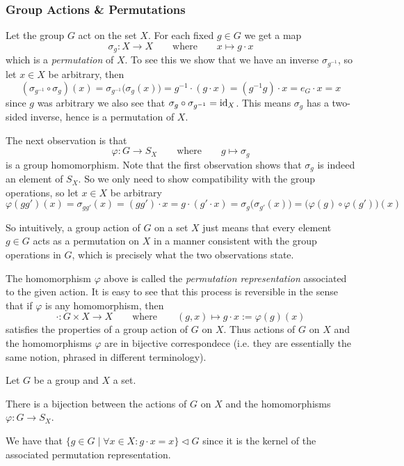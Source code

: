 \subsubsection{Group Actions \& Permutations}
Let the group \(G\) act on the set \(X\).
For each fixed \(g \in G\) we get a map
\[\sigma_g: X \to X \qquad\text{where}\qquad x \mapsto g \cdot x\]
which is a \emph{permutation} of \(X\).
To see this we show that we have an inverse \(\sigma_{g^{-1}}\), so let \(x \in X\) be arbitrary, then
\[(\sigma_{g^{-1}} \circ \sigma_g)(x) = \sigma_{g^{-1}}\big(\sigma_g(x)\big) = g^{-1} \cdot (g \cdot x) = (g^{-1}g) \cdot x = e_G \cdot x = x\]
since \(g\) was arbitrary we also see that \(\sigma_g \circ \sigma_{g^{-1}} = \operatorname{id}_X\).
This means \(\sigma_g\) has a two-sided inverse, hence is a permutation of \(X\).

The next observation is that
\[\varphi: G \to S_X \qquad\text{where}\qquad g \mapsto \sigma_g\]
is a group homomorphism.
Note that the first observation shows that \(\sigma_g\) is indeed an element of \(S_X\).
So we only need to show compatibility with the group operations, so let \(x \in X\) be arbitrary
\[\varphi(gg')(x) = \sigma_{gg'}(x) = (gg') \cdot x = g \cdot (g' \cdot x) = \sigma_g\big(\sigma_{g'}(x)\big) = \big(\varphi(g) \circ \varphi(g')\big)(x)\]

So intuitively, a group action of \(G\) on a set \(X\) just means that every element \(g \in G\) acts as a permutation on \(X\) in a manner consistent with the group operations in \(G\), which is precisely what the two observations state.

The homomorphism \(\varphi\) above is called the \emph{permutation representation} associated to the given action.
It is easy to see that this process is reversible in the sense that if \(\varphi\) is any homomorphism, then
\[\cdot: G \times X \to X \qquad\text{where}\qquad (g, x) \mapsto g \cdot x := \varphi(g)(x)\]
satisfies the properties of a group action of \(G\) on \(X\).
Thus actions of \(G\) on \(X\) and the homomorphisms \(\varphi\) are in bijective correspondece (i.e. they are essentially the same notion, phrased in different terminology).

\begin{proposition}
   Let \(G\) be a group and \(X\) a set.

   There is a bijection between the actions of \(G\) on \(X\) and the homomorphisms \(\varphi: G \to S_X\).
\end{proposition}
\begin{remark}
   We have that \(\{g \in G \mid \forall x \in X: g \cdot x = x\} \triangleleft G\) since it is the kernel of the associated permutation representation.
\end{remark}

